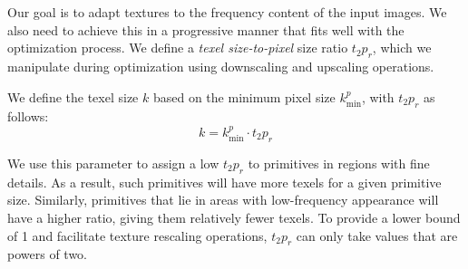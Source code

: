 

Our goal is to adapt textures to the frequency content of the input images. We also need to achieve this in a progressive manner that fits well with the optimization process. We define a \emph{texel size-to-pixel} size ratio ${t_{2}p}_r$, which we manipulate during optimization using downscaling and upscaling operations.

We define the texel size $k$ based on the minimum pixel size ${k}^p_{\mathrm{min}}$, with ${t_{2}p}_r$ as follows:
\begin{equation}
    k = {k}^p_{\mathrm{min}} \cdot {t_{2}p}_r
\end{equation}

\noindent
We use this parameter to assign a low $t_2p_r$ to primitives in regions with fine details.
As a result, such primitives will have more texels for a given primitive size.
Similarly, primitives that lie in areas with low-frequency appearance will have a higher ratio,
giving them relatively fewer texels.
To provide a lower bound of 1 and facilitate texture rescaling operations,
$t_2p_r$ can only take values that are powers of two.

